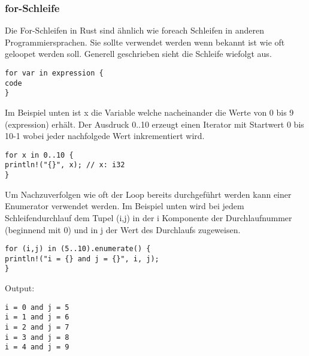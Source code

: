 \subsubsection{for-Schleife}
Die For-Schleifen in Rust sind ähnlich wie foreach Schleifen in anderen Programmiersprachen. Sie sollte verwendet werden wenn bekannt ist wie oft geloopet werden soll.
Generell geschrieben sieht die Schleife wiefolgt aus.
\begin{lstlisting}
for var in expression {
code
}
\end{lstlisting}

Im Beispiel unten ist x die Variable welche nacheinander die Werte von 0 bis 9 (expression) erhält. Der Ausdruck 0..10 erzeugt einen Iterator mit Startwert 0 bis 10-1 wobei jeder nachfolgede Wert inkrementiert wird. 
\begin{lstlisting}
for x in 0..10 {
println!("{}", x); // x: i32
}
\end{lstlisting}

Um Nachzuverfolgen wie oft der Loop bereits durchgeführt werden kann einer Enumerator verwendet werden. Im Beispiel unten wird bei jedem Schleifendurchlauf dem Tupel (i,j) in der i Komponente der Durchlaufnummer (beginnend mit 0) und in j der Wert des Durchlaufs zugeweisen.

\begin{lstlisting}
for (i,j) in (5..10).enumerate() {
println!("i = {} and j = {}", i, j);
}
\end{lstlisting}
Output:
\begin{lstlisting}
i = 0 and j = 5
i = 1 and j = 6
i = 2 and j = 7
i = 3 and j = 8
i = 4 and j = 9
\end{lstlisting}